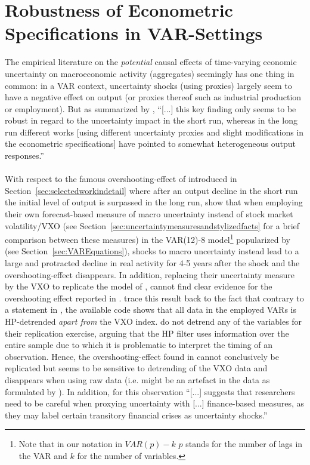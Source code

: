 \documentclass[a4paper,11pt,listof=nochaptergap,oneside,pointednumbers,bibtotoc,bigheadings,liststotoc,hidelinks]{scrbook}
\theoremstyle{mysatz}
\theoremstyle{mydefinition}
\theoremstyle{mytheorem}
\theoremstyle{mybemerkung}
\begin{document}
\section[Robustness of Econometric Specifications in VAR-Settings]{Robustness of Econometric Specifications in VAR-Settings}
\label{sec:robustnessofeconspecs}
The empirical literature on the \textit{potential} causal effects of time-varying economic uncertainty on macroeconomic activity (aggregates) seemingly has one thing in common: in a VAR context, uncertainty shocks (using proxies) largely seem to have a negative effect on output (or proxies thereof such as industrial production or employment). But as summarized by \citet[p. 23]{bontempietal:16}, ``[...] this key finding only seems to be robust in regard to the uncertainty impact in the short run, whereas in the long run different works [using different uncertainty proxies and slight modifications in the econometric specifications] have pointed to somewhat heterogeneous output responses.''\\
\\
With respect to the famous overshooting-effect of \citet{bloom:09} introduced in Section~\ref{sec:selectedworkindetail} where after an output decline in the short run the initial level of output is surpassed in the long run, \citet{juradoetal:15} show that when employing their own forecast-based measure of macro uncertainty instead of stock market volatility/VXO (see Section~\ref{sec:uncertaintymeasuresandstylizedfacts} for a brief comparison between these measures) in the VAR(12)-8 model\footnote{Note that in our notation in $VAR(p)-k$ $p$ stands for the number of lags in the VAR and $k$ for the number of variables.} popularized by \citet{bloom:09} (see Section~\ref{sec:VAREquations}), shocks to macro uncertainty instead lead to a large and protracted decline in real activity for 4-5 years after the shock and the overshooting-effect disappears. In addition, replacing their uncertainty measure by the VXO to replicate the model of \citet{bloom:09}, \citet{juradoetal:15} cannot find clear evidence for the overshooting effect reported in \citet{bloom:09}. \citet{juradoetal:15} trace this result back to the fact that contrary to a statement in \citet{bloom:09}, the available code shows that all data in the employed VARs is HP-detrended \textit{apart from} the VXO index. \citet{juradoetal:15} do not detrend any of the variables for their replication exercise, arguing that the HP filter uses information over the entire sample due to which it is problematic to interpret the timing of an observation. Hence, the overshooting-effect found in \citet{bloom:09} cannot conclusively be replicated but seems to be sensitive to detrending of the VXO data and disappears when using raw data (i.e. might be an artefact in the data as formulated by \citealp{bontempietal:16}). In addition, for \citet[p. 24]{bontempietal:16} this observation ``[...] suggests that researchers need to be careful when proxying uncertainty with [...] finance-based measures, as they may label certain transitory financial crises as uncertainty shocks.''
\end{document}
